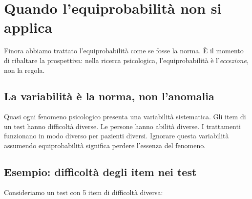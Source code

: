 \documentclass[
  italian,
  letterpaper,
  a4paper,
  11pt,
  open=any]{scrbook}
\theoremstyle{plain}
\theoremstyle{definition}
\theoremstyle{definition}
\theoremstyle{remark}
\begin{document}
\section{Quando l'equiprobabilità non si
applica}\label{sec-limits-of-equiprobability}

Finora abbiamo trattato l'equiprobabilità come se fosse la norma. È il
momento di ribaltare la prospettiva: nella ricerca psicologica,
l'equiprobabilità è l'\emph{eccezione}, non la regola.

\subsection{La variabilità è la norma, non
l'anomalia}\label{la-variabilituxe0-uxe8-la-norma-non-lanomalia}

Quasi ogni fenomeno psicologico presenta una variabilità sistematica.
Gli item di un test hanno difficoltà diverse. Le persone hanno abilità
diverse. I trattamenti funzionano in modo diverso per pazienti diversi.
Ignorare questa variabilità assumendo equiprobabilità significa perdere
l'essenza del fenomeno.

\subsection{Esempio: difficoltà degli item nei
test}\label{esempio-difficoltuxe0-degli-item-nei-test}

Consideriamo un test con 5 item di difficoltà diversa:
\end{document}
